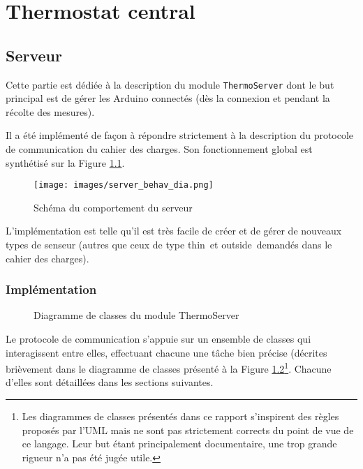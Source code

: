 \documentclass[11pt,a4paper,11pt]{report}
\begin{document}
\newpage

\chapter{Thermostat central}

\section{Serveur}

Cette partie est dédiée à la description du module \texttt{ThermoServer} dont le but principal est de gérer les Arduino connectés (dès la connexion et pendant la récolte des mesures). 

Il a été implémenté de façon à répondre strictement à la description du protocole de communication du cahier des charges. Son fonctionnement global est synthétisé sur la Figure \ref{server_behav_dia}.

\begin{figure}
\centering
\texttt{[image: images/server\_behav\_dia.png]}
\caption{Schéma du comportement du serveur}
\label{server_behav_dia}
\end{figure}


L'implémentation est telle qu'il est très facile de créer et de gérer de nouveaux types de senseur (autres que ceux de type \og thin\fg ~et \og outside\fg  ~demandés dans le cahier des charges).

\subsection{Implémentation}
\begin{figure}
\caption{Diagramme de classes du module ThermoServer}
\label{ThermoServer_class_diagram}
\end{figure}
Le protocole de communication s'appuie sur un ensemble de classes qui interagissent entre elles, effectuant chacune une tâche bien précise (décrites brièvement dans le diagramme de classes présenté à la Figure \ref{ThermoServer_class_diagram}\footnote{Les diagrammes de classes présentés dans ce rapport s'inspirent des règles proposés par l'UML mais ne sont pas strictement corrects du point de vue de ce langage. Leur but étant principalement documentaire, une trop grande rigueur n'a pas été jugée utile.}. Chacune d'elles sont détaillées dans les sections suivantes.
\end{document}

